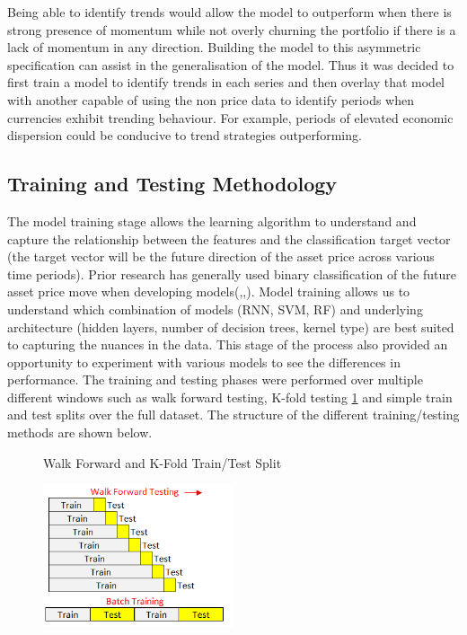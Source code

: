 \documentclass[11pt]{article}
\begin{document}
Being able to identify trends would allow the model to outperform when there is strong presence of momentum while not overly churning the portfolio if there is a lack of momentum in any direction. Building the model to this asymmetric specification can assist in the generalisation of the model. \newline Thus it was decided to first train a model to identify trends in each series and then overlay that model with another capable of using the non price data to identify periods when currencies exhibit trending behaviour. For example, periods of elevated economic dispersion could be conducive to trend strategies outperforming.

\subsection{Training and Testing Methodology}
The model training stage allows the learning algorithm to understand and capture the relationship between the features and the classification target vector (the target vector will be the future direction of the asset price across various time periods). Prior research has generally used binary classification of the future asset price move when developing models(\cite{Abreu2018},\cite{Gunduz2017},\cite{Chatzis2018}). \newline Model training allows us to understand which combination of models (RNN, SVM, RF) and underlying architecture (hidden layers, number of decision trees, kernel type) are best suited to capturing the nuances in the data. This stage of the process also provided an opportunity to experiment with various models to see the differences in performance. The training and testing phases were performed over multiple different windows such as walk forward testing, K-fold testing \ref{fig:Train_Test} and simple train and test splits over the full dataset. The structure of the different training/testing methods are shown below.
\begin{figure}[h]
    \centering
	\caption{Walk Forward and K-Fold Train/Test Split}    
	\includegraphics[width=0.5\textwidth]{Train_test}
    \label{fig:Train_Test}
     \caption*{}
\end{figure}
\end{document}
